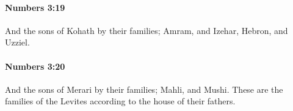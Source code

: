 		\paragraph{Numbers 3:19} %
			\label{NUMBERS-3-19}

			And the sons of Kohath by their families; Amram, and Izehar, Hebron, and Uzziel.


		\paragraph{Numbers 3:20} %
			\label{NUMBERS-3-20}

			And the sons of Merari by their families; Mahli, and Mushi. These are the families of the Levites according to the house of their fathers.


